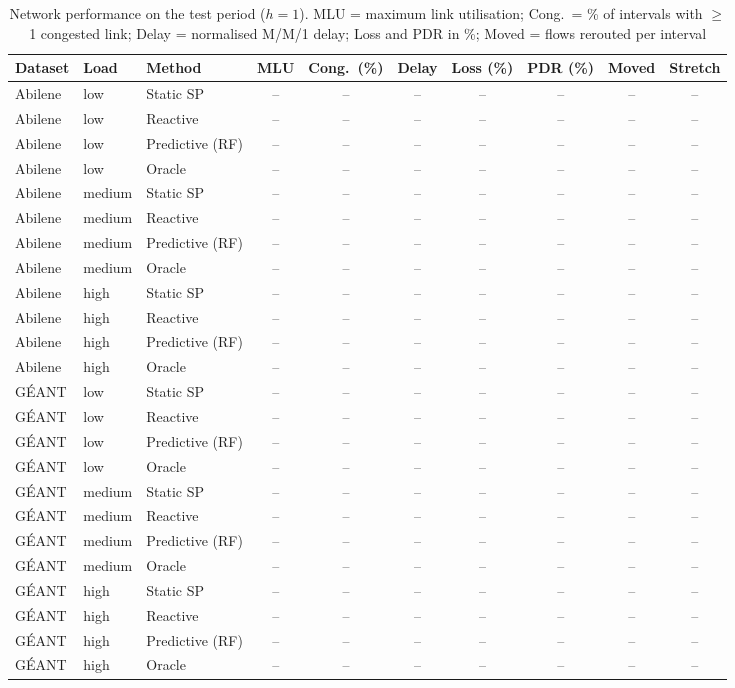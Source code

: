 \begin{table}[t]
\centering
\caption{Network performance on the test period ($h=1$). MLU = maximum link utilisation; Cong.\ = \% of intervals with $\ge$1 congested link; Delay = normalised M/M/1 delay; Loss and PDR in \%; Moved = flows rerouted per interval}
\label{tab:route}
\scriptsize
\begin{tabular}{@{}lllccccccc@{}}
\toprule
Dataset & Load & Method & MLU & Cong.\ (\%) & Delay & Loss (\%) & PDR (\%) & Moved & Stretch \\
\midrule
Abilene & low & Static SP & -- & -- & -- & -- & -- & -- & -- \\
Abilene & low & Reactive & -- & -- & -- & -- & -- & -- & -- \\
Abilene & low & Predictive (RF) & -- & -- & -- & -- & -- & -- & -- \\
Abilene & low & Oracle & -- & -- & -- & -- & -- & -- & -- \\
Abilene & medium & Static SP & -- & -- & -- & -- & -- & -- & -- \\
Abilene & medium & Reactive & -- & -- & -- & -- & -- & -- & -- \\
Abilene & medium & Predictive (RF) & -- & -- & -- & -- & -- & -- & -- \\
Abilene & medium & Oracle & -- & -- & -- & -- & -- & -- & -- \\
Abilene & high & Static SP & -- & -- & -- & -- & -- & -- & -- \\
Abilene & high & Reactive & -- & -- & -- & -- & -- & -- & -- \\
Abilene & high & Predictive (RF) & -- & -- & -- & -- & -- & -- & -- \\
Abilene & high & Oracle & -- & -- & -- & -- & -- & -- & -- \\
G\'EANT & low & Static SP & -- & -- & -- & -- & -- & -- & -- \\
G\'EANT & low & Reactive & -- & -- & -- & -- & -- & -- & -- \\
G\'EANT & low & Predictive (RF) & -- & -- & -- & -- & -- & -- & -- \\
G\'EANT & low & Oracle & -- & -- & -- & -- & -- & -- & -- \\
G\'EANT & medium & Static SP & -- & -- & -- & -- & -- & -- & -- \\
G\'EANT & medium & Reactive & -- & -- & -- & -- & -- & -- & -- \\
G\'EANT & medium & Predictive (RF) & -- & -- & -- & -- & -- & -- & -- \\
G\'EANT & medium & Oracle & -- & -- & -- & -- & -- & -- & -- \\
G\'EANT & high & Static SP & -- & -- & -- & -- & -- & -- & -- \\
G\'EANT & high & Reactive & -- & -- & -- & -- & -- & -- & -- \\
G\'EANT & high & Predictive (RF) & -- & -- & -- & -- & -- & -- & -- \\
G\'EANT & high & Oracle & -- & -- & -- & -- & -- & -- & -- \\
\bottomrule
\end{tabular}
\end{table}
